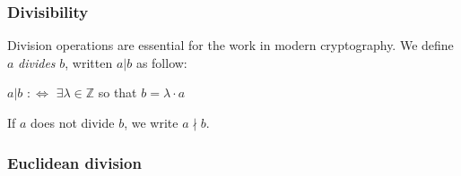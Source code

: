 		\subsubsection{Divisibility}
			Division operations are essential for the work in modern cryptography. We define $a$ \textit{divides} $b$, written $a|b$ as follow:
			\begin{center}
				$a|b$ $:\Leftrightarrow$ $\exists \lambda \in \mathbb{Z}$ so that $b = \lambda \cdot a$
			\end{center}
			If $a$ does not divide $b$, we write $a \nmid b$.
		
		\subsubsection{Euclidean division}
			

























